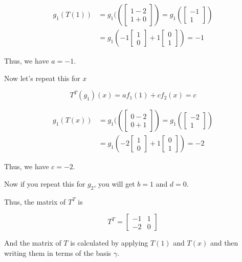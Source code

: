 \begin{align*}
    g_1(T(1)) & = g_1((\begin{bmatrix} 1 - 2 \\ 1 + 0 \end{bmatrix}) = g_1(\begin{bmatrix} -1 \\ 1 \end{bmatrix}) \\
              & = g_1(-1\begin{bmatrix} 1 \\ 0 \end{bmatrix} + 1\begin{bmatrix} 0 \\ 1 \end{bmatrix}) = -1
\end{align*}

Thus, we have \(a = -1\).

Now let's repeat this for \(x\)

\[
    T^T(g_1)(x) = a f_1(1) + c f_2(x) = c
\]

\begin{align*}
    g_1(T(x)) & = g_1((\begin{bmatrix} 0 - 2 \\ 0 + 1 \end{bmatrix}) = g_1(\begin{bmatrix} -2 \\ 1 \end{bmatrix}) \\
              & = g_1(-2\begin{bmatrix} 1 \\ 0 \end{bmatrix} + 1\begin{bmatrix} 0 \\ 1 \end{bmatrix}) = -2
\end{align*}

Thus, we have \(c = -2\).

Now if you repeat this for \(g_2\), you will get \(b = 1\) and \(d = 0\).

Thus, the matrix of \(T^T\) is

\[
    T^T =
    \begin{bmatrix}
        -1 & 1 \\
        -2 & 0
    \end{bmatrix}
\]

And the matrix of \(T\) is calculated by applying \(T(1)\) and \(T(x)\) and then writing them in terms
of the basis \(\gamma\).

